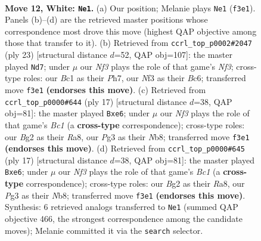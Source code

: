 \documentclass[11pt]{article}
\begin{document}
\clearpage

\begin{figure}[p]\centering
\begin{subfigure}{0.46\textwidth}\centering
\resizebox{\linewidth}{!}{%
\newchessgame
\chessboard[
  setfen={1rbq1rk1/ppn2pbp/2n3p1/2p1p3/7P/3PPNP1/PP3PB1/RNBQ1RK1 w - - 1 12},
  showmover=false,
  pgfstyle=straightmove, color=movearrow, markmove={f3-e1}
]}
\caption{}
\end{subfigure}\hfill
\begin{subfigure}{0.46\textwidth}\centering
\resizebox{\linewidth}{!}{%
\newchessgame
\chessboard[
  setfen={r2q1rk1/1p2bppp/p1bppn2/8/2P1P3/2N3P1/PP3PBP/R1BQ1RK1 b - - 1 12},
  showmover=false,
  pgfstyle=straightmove, color=movearrow, markmove={f6-d7}
]}
\caption{}
\end{subfigure}
\\[4pt]
\begin{subfigure}{0.46\textwidth}\centering
\resizebox{\linewidth}{!}{%
\newchessgame
\chessboard[
  setfen={rnbq1rk1/pp4bp/2ppPnp1/5p2/2P5/2N2NP1/PP2PPBP/R1BQ1RK1 b - - 0 9},
  showmover=false,
  pgfstyle=straightmove, color=movearrow, markmove={c8-e6}
]}
\caption{}
\end{subfigure}\hfill
\begin{subfigure}{0.46\textwidth}\centering
\resizebox{\linewidth}{!}{%
\newchessgame
\chessboard[
  setfen={rnbq1rk1/pp4bp/2ppPnp1/5p2/2P5/2N2NP1/PP2PPBP/R1BQ1RK1 b - - 0 9},
  showmover=false,
  pgfstyle=straightmove, color=movearrow, markmove={c8-e6}
]}
\caption{}
\end{subfigure}
\caption{\textbf{Move 12, White: \texttt{Ne1}.} (a) Our position; Melanie plays \texttt{Ne1} (\texttt{f3e1}). Panels (b)--(d) are the retrieved master positions whose correspondence most drove this move (highest QAP objective among those that transfer to it). (b) Retrieved from \texttt{ccrl\_top\_p0002\#2047} (ply 23) [structural distance $d$=52, QAP obj=107]: the master played \texttt{Nd7}; under $\mu$ our \emph{Nf3} plays the role of that game's \emph{Nf3}; cross-type roles: our \emph{B}c1 as their \emph{P}h7, our \emph{N}f3 as their \emph{B}c6; transferred move \texttt{f3e1} \textbf{(endorses this move)}. (c) Retrieved from \texttt{ccrl\_top\_p0000\#644} (ply 17) [structural distance $d$=38, QAP obj=81]: the master played \texttt{Bxe6}; under $\mu$ our \emph{Nf3} plays the role of that game's \emph{Bc1} (a \textbf{cross-type} correspondence); cross-type roles: our \emph{B}g2 as their \emph{R}a8, our \emph{P}g3 as their \emph{N}b8; transferred move \texttt{f3e1} \textbf{(endorses this move)}. (d) Retrieved from \texttt{ccrl\_top\_p0000\#645} (ply 17) [structural distance $d$=38, QAP obj=81]: the master played \texttt{Bxe6}; under $\mu$ our \emph{Nf3} plays the role of that game's \emph{Bc1} (a \textbf{cross-type} correspondence); cross-type roles: our \emph{B}g2 as their \emph{R}a8, our \emph{P}g3 as their \emph{N}b8; transferred move \texttt{f3e1} \textbf{(endorses this move)}. Synthesis: 6 retrieved analogs transferred to \texttt{Ne1} (summed QAP objective 466, the strongest correspondence among the candidate moves); Melanie committed it via the \texttt{search} selector.}
\label{fig:thought-m22}
\end{figure}
\end{document}
